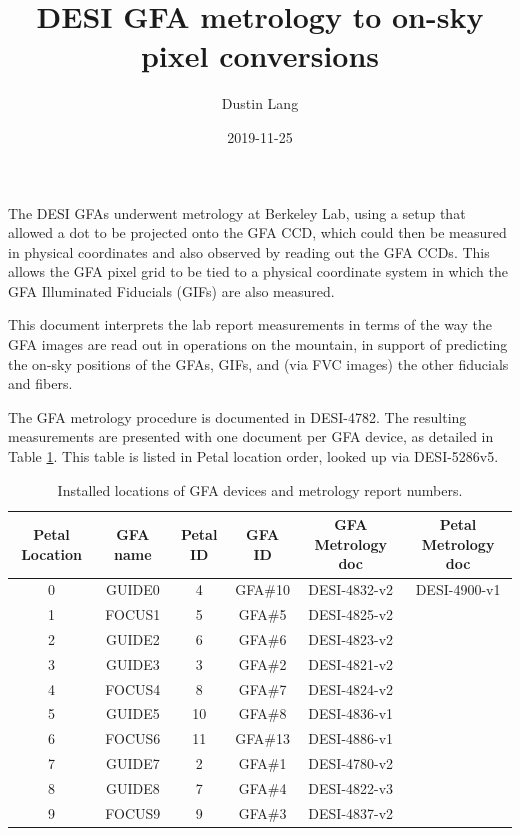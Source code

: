 \documentclass[10pt]{article}
\title{DESI GFA metrology to on-sky pixel conversions}
\author{Dustin Lang}
\date{2019-11-25}
\begin{document}
\maketitle

The DESI GFAs underwent metrology at Berkeley Lab, using a setup that
allowed a dot to be projected onto the GFA CCD, which could then be
measured in physical coordinates and also observed by reading out the
GFA CCDs.  This allows the GFA pixel grid to be tied to a physical
coordinate system in which the GFA Illuminated Fiducials (GIFs) are
also measured.

This document interprets the lab report measurements in terms of the
way the GFA images are read out in operations on the mountain, in
support of predicting the on-sky positions of the GFAs, GIFs, and (via
FVC images) the other fiducials and fibers.

The GFA metrology procedure is documented in DESI-4782.  The resulting
measurements are presented with one document per GFA device, as
detailed in Table \ref{tab:gfareports}.  This table is listed in Petal
location order, looked up via DESI-5286v5.

\begin{table}[h!]
  \begin{center}
    \begin{tabular}{|c|c|c|c|c|c|}
      \hline
      Petal Location & GFA name & Petal ID & GFA ID & GFA Metrology doc & Petal Metrology doc \\
      \hline
      0 & GUIDE0 & 4  & GFA\#10 & DESI-4832-v2 & DESI-4900-v1 \\
      1 & FOCUS1 & 5  & GFA\#5 & DESI-4825-v2 \\
      2 & GUIDE2 & 6  & GFA\#6 & DESI-4823-v2 \\
      3 & GUIDE3 & 3  & GFA\#2 & DESI-4821-v2 \\
      4 & FOCUS4 & 8  & GFA\#7 & DESI-4824-v2 \\
      5 & GUIDE5 & 10 & GFA\#8 & DESI-4836-v1 \\
      6 & FOCUS6 & 11 & GFA\#13 & DESI-4886-v1 \\
      7 & GUIDE7 & 2  & GFA\#1 & DESI-4780-v2 \\
      8 & GUIDE8 & 7  & GFA\#4 & DESI-4822-v3 \\
      9 & FOCUS9 & 9  & GFA\#3 & DESI-4837-v2 \\
      \hline
    \end{tabular}
    \caption{\label{tab:gfareports}Installed locations of GFA devices and
      metrology report numbers.}
  \end{center}
\end{table}
\end{document}
